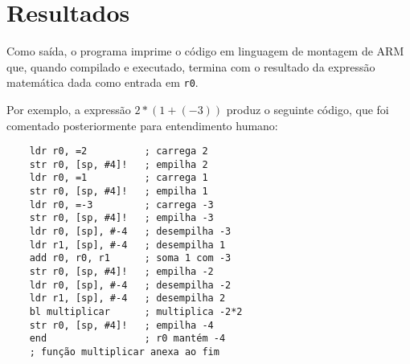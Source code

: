 \documentclass[brazilian,a4paper,twocolumn]{article}
\begin{document}
\section{Resultados}

    Como saída, o programa imprime o código em linguagem de montagem de ARM que, quando compilado e executado, termina com o resultado da expressão matemática dada como entrada em \texttt{r0}.

    Por exemplo, a expressão $ 2 * (1 + (-3)) $ produz o seguinte código, que foi comentado posteriormente para entendimento humano:

\begin{verbatim}
    ldr r0, =2          ; carrega 2
    str r0, [sp, #4]!   ; empilha 2
    ldr r0, =1          ; carrega 1
    str r0, [sp, #4]!   ; empilha 1
    ldr r0, =-3         ; carrega -3
    str r0, [sp, #4]!   ; empilha -3
    ldr r0, [sp], #-4   ; desempilha -3
    ldr r1, [sp], #-4   ; desempilha 1
    add r0, r0, r1      ; soma 1 com -3
    str r0, [sp, #4]!   ; empilha -2
    ldr r0, [sp], #-4   ; desempilha -2
    ldr r1, [sp], #-4   ; desempilha 2
    bl multiplicar      ; multiplica -2*2
    str r0, [sp, #4]!   ; empilha -4
    end                 ; r0 mantém -4
    ; função multiplicar anexa ao fim
\end{verbatim}
\end{document}
